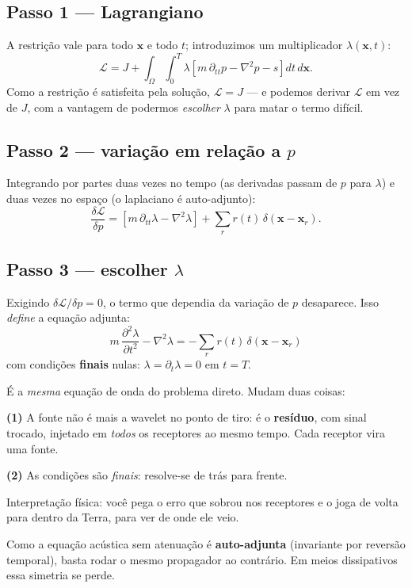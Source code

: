 \documentclass[11pt,a4paper,oneside]{report}
\begin{document}
\subsection*{Passo 1 --- Lagrangiano}

A restrição vale para todo $\mathbf{x}$ e todo $t$; introduzimos um
multiplicador $\lambda(\mathbf{x},t)$:
\begin{equation}
\mathcal{L} = J + \int_{\Omega}\!\!\int_{0}^{T}
\lambda\left[m\,\partial_{tt}p - \nabla^{2}p - s\right] dt\,d\mathbf{x}.
\end{equation}
Como a restrição é satisfeita pela solução, $\mathcal{L} = J$ --- e podemos
derivar $\mathcal{L}$ em vez de $J$, com a vantagem de podermos
\emph{escolher} $\lambda$ para matar o termo difícil.

\subsection*{Passo 2 --- variação em relação a $p$}

Integrando por partes duas vezes no tempo (as derivadas passam de $p$ para
$\lambda$) e duas vezes no espaço (o laplaciano é auto-adjunto):
\begin{equation}
\frac{\delta\mathcal{L}}{\delta p}
 = \left[m\,\partial_{tt}\lambda - \nabla^{2}\lambda\right]
 + \sum_{r} r(t)\,\delta(\mathbf{x}-\mathbf{x}_r).
\end{equation}

\subsection*{Passo 3 --- escolher $\lambda$}

Exigindo $\delta\mathcal{L}/\delta p = 0$, o termo que dependia da variação de
$p$ desaparece. Isso \emph{define} a equação adjunta:
\begin{equation}
\boxed{\;
m\,\frac{\partial^{2}\lambda}{\partial t^{2}} - \nabla^{2}\lambda
 = -\sum_{r} r(t)\,\delta(\mathbf{x}-\mathbf{x}_r)\;}
\label{eq:adjunta}
\end{equation}
com condições \textbf{finais} nulas: $\lambda = \partial_t\lambda = 0$ em
$t = T$.

\begin{teoria}
É a \emph{mesma} equação de onda do problema direto. Mudam duas coisas:

\textbf{(1)} A fonte não é mais a wavelet no ponto de tiro: é o
\textbf{resíduo}, com sinal trocado, injetado em \emph{todos} os receptores ao
mesmo tempo. Cada receptor vira uma fonte.

\textbf{(2)} As condições são \emph{finais}: resolve-se de trás para frente.

Interpretação física: você pega o erro que sobrou nos receptores e o joga de
volta para dentro da Terra, para ver de onde ele veio.

Como a equação acústica sem atenuação é \textbf{auto-adjunta} (invariante por
reversão temporal), basta rodar o mesmo propagador ao contrário. Em meios
dissipativos essa simetria se perde.
\end{teoria}
\end{document}
